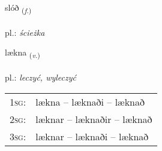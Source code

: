 \documentclass[frontgrid, backgrid]{flacards}\usepackage[]{graphicx}\usepackage[]{xcolor}
\begin{document}
\renewcommand{\blhead}{\vskip5pt {\small\bfseries\footnotesize Nafnorð | Noun }}
\renewcommand{\bcfoot}{\vskip5pt \hspace{2pt}{\small\bfseries\footnotesize 2K}}


{slóð \small{\textsubscript{(\textit{f.})}} \\[1ex] %
\textphonetic{[stlouːð]} \\
pl.: \emph{ścieżka} \\  [2ex]
\renewcommand*{\arraystretch}{0.8}
}

\renewcommand{\flhead}{\vskip5pt \fboxsep=0pt {\small\bfseries\footnotesize Sagnorð | Verb}}
\renewcommand{\fcfoot}{\vskip5pt \fboxsep=0pt \hspace{2pt}{\small\bfseries\footnotesize 2K}}

\renewcommand{\blhead}{\vskip5pt {\small\bfseries\footnotesize Sagnorð | Verb }}
\renewcommand{\bcfoot}{\vskip5pt \hspace{2pt}{\small\bfseries\footnotesize 2K}}


{lækna \small{\textsubscript{(\textit{v.})}} \\[1ex] %
\textphonetic{[laihkna]} \\
pl.: \emph{leczyć, wyleczyć} \\  [2ex]
\renewcommand*{\arraystretch}{0.8}
\begin{tabular}{p{1cm}l}
\textsc{1sg}: & lækna -- læknaði -- læknað \\ 
\textsc{2sg}: & læknar -- læknaðir -- læknað \\ 
\textsc{3sg}: & læknar -- læknaði -- læknað \\ 
\end{tabular}
}

\renewcommand{\flhead}{\vskip5pt \fboxsep=0pt {\small\bfseries\footnotesize Nafnorð | Noun}}
\renewcommand{\fcfoot}{\vskip5pt \fboxsep=0pt \hspace{2pt}{\small\bfseries\footnotesize 2K}}
\end{document}

